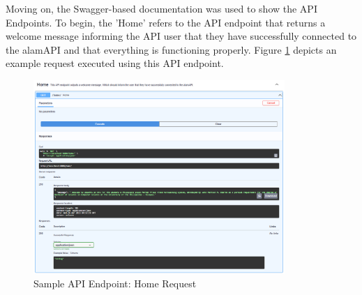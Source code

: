Moving on, the Swagger-based documentation was used to show the API Endpoints. To begin, the 
'Home' refers to the API endpoint that returns a welcome message informing the API user that they 
have successfully connected to the alamAPI and that everything is functioning properly. 
Figure \ref{fig:alamAPI_home} depicts 
an example request executed using this API endpoint.
\\
\begin{figure}[ht]
    \centering
    \includegraphics[width=0.85\textwidth]{./assets/Chapter_4/Documentation/alamAPI_home.png}
    \caption{Sample API Endpoint: Home Request}
    \label{fig:alamAPI_home}
\end{figure}
\FloatBarrier

